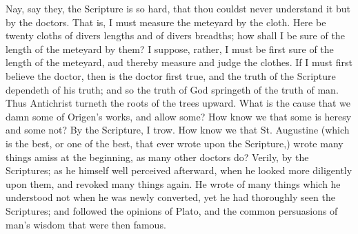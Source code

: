 Nay, say they, the Scripture is so hard, that 
thou couldst never understand it but by the doctors. 
That is, I must measure the meteyard by the 
cloth. Here be twenty cloths of divers lengths 
and of divers breadths; how shall I be sure of 
the length of the meteyard by them? I suppose,
rather, I must be first sure of the length of 
the meteyard, aud thereby measure and judge 
the clothes. If I must first believe the doctor,
then is the doctor first true, and the truth of the 
Scripture dependeth of his truth; and so the 
truth of God springeth of the truth of man. 
Thus Antichrist turneth the roots of the trees 
upward. What is the cause that we damn 
some of Origen's works, and allow some? How 
know we that some is heresy and some not? 
By the Scripture, I trow. How know we that 
St. Augustine (which is the best, or one of the 
best, that ever wrote upon the Scripture,) wrote 
many things amiss at the beginning, as many 
other doctors do? Verily, by the Scriptures; 
as he himself well perceived afterward, when he 
looked more diligently upon them, and revoked 
many things again. He wrote of many things 
which he understood not when he was newly 
converted, yet he had thoroughly seen the Scriptures;
and followed the opinions of Plato, and 
the common persuasions of man's wisdom that 
were then famous. 

